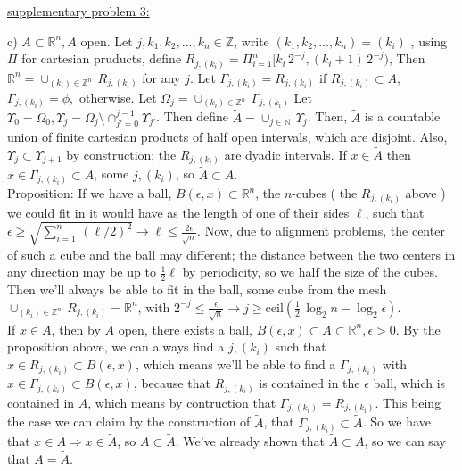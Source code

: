 \documentclass[12pt]{article}
\begin{document}
\begin{flushleft}
\underline{supplementary problem 3:}
\end{flushleft}

\begin{flushleft}
c) $A \subset \mathbb{R}^n, A$ open. Let $j,k_1,k_2,...,k_n \in \mathbb{Z}$, write $(k_1,k_2,...,k_n) = (k_i)$ , using $\Pi$ for cartesian pruducts, define $R_{j,(k_i)} = \Pi_{i=1}^n [ k_i \, 2^{-j}, (k_i+1) \, 2^{-j} )$, Then $\mathbb{R}^n = \cup_{(k_i) \in \mathbb{Z}^n } \, R_{j,(k_i)}$ for any $j$. Let $\Gamma_{j,(k_i)} = R_{j,(k_i)}$ if $ R_{j,(k_i)} \subset A$, $\Gamma_{j,(k_i)} = \phi,$ otherwise.
Let $\Omega_j = \cup_{(k_i) \in \mathbb{Z}^n } \, \Gamma_{j,(k_i)}  $
Let $\Upsilon_0 = \Omega_0, \Upsilon_j = \Omega_j \setminus \cap_{j'=0}^{j-1} \Upsilon_{j'}$. 
Then define $\tilde{A} = \cup_{j \in \mathbb{N} } \, \Upsilon_j $.  
    Then, $\tilde{A}$ is a countable union of finite cartesian products of half open intervals, which are disjoint. Also, $\Upsilon_j \subset \Upsilon_{j+1}$ by construction; the $R_{j,(k_i)}$ are dyadic intervals.
If $x \in \tilde{A}$ then $x \in \Gamma_{j,(k_i)} \subset A$, some $j,(k_i)$, so $\tilde{A} \subset A.$ \\
Proposition: If we have a ball, $B(\epsilon,x) \subset \mathbb{R}^n$, the $n$-cubes ( the $R_{j,(k_i)}$ above ) we could fit in it would have as the length of one of their sides $\ell$, such that $\epsilon \ge \sqrt{\sum_{i=1}^n \, (\ell/2)^2} \rightarrow \ell \le \frac{2 \epsilon}{ \sqrt{n}}  $. Now, due to alignment problems, the center of such a cube and the ball may different; the distance between the two centers in any direction may be up to $\frac{1}{2} \ell$ by periodicity, so we half the size of the cubes. Then we'll always be able to fit in the ball, some cube from the mesh $\cup_{(k_i) \in \mathbb{Z}^n } \, R_{j,(k_i)} = \mathbb{R}^n $, with 
$2^{-j} \le \frac{\epsilon}{\sqrt{n}} \rightarrow j \ge \textrm{ceil} \left( \frac{1}{2} \, \log_2{n} - \log_2{\epsilon} \right)$. \\
If $x \in A$, then by $A$ open, there exists a ball, $B(\epsilon,x) \subset A \subset \mathbb{R}^n, \epsilon>0$. By the proposition above, we can always find a $j,(k_i)$ such that $x \in R_{j,(k_i)} \subset B(\epsilon,x)$, which means we'll be able to find a $\Gamma_{j,(k_i)}$ with $x \in \Gamma_{j,(k_i)} \subset B(\epsilon,x)$, because that $R_{j,(k_i)}$ is contained in the $\epsilon$ ball, which is contained in $A$, which means by contruction that $\Gamma_{j,(k_i)} = R_{j,(k_i)}$. This being the case we can claim by the construction of $\tilde{A}$, that $\Gamma_{j,(k_i)} \subset \tilde{A}$. So we have that $x \in A \Rightarrow x \in \tilde{A}$, so $A \subset \tilde{A}.$ We've already shown that $\tilde{A} \subset A$, so we can say that $A = \tilde{A}.$
\end{flushleft}
\end{document}
